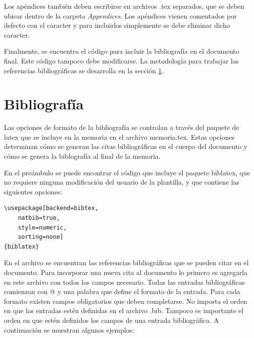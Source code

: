 \begin{verbatim}
	
	 
	
	 
	 
\end{verbatim}

Los apéndices también deben escribirse en archivos .tex separados, que se deben ubicar dentro de la carpeta \emph{Appendices}. Los apéndices vienen comentados por defecto con el caracter \code{\%} y para incluirlos simplemente se debe eliminar dicho caracter.

Finalmente, se encuentra el código para incluir la bibliografía en el documento final.  Este código tampoco debe modificarse. La metodología para trabajar las referencias bibliográficas se desarrolla en la sección \ref{sec:biblio}.

\section{Bibliografía}
\label{sec:biblio}

Las opciones de formato de la bibliografía se controlan a través del paquete de latex  que se incluye en la memoria en el archivo memoria.tex.  Estas opciones determinan cómo se generan las citas bibliográficas en el cuerpo del documento y cómo se genera la biblografía al final de la memoria.

En el preámbulo se puede encontrar el código que incluye el paquete biblatex, que no requiere ninguna modificación del usuario de la plantilla, y que contiene las siguientes opciones:

\begin{lstlisting}
\usepackage[backend=bibtex,
	natbib=true, 
	style=numeric, 
	sorting=none]
{biblatex}
\end{lstlisting}

En el archivo  se encuentran las referencias bibliográficas que se pueden citar en el documento.  Para incorporar una nueva cita al documento lo primero es agregarla en este archivo con todos los campos necesario.  Todas las entradas bibliográficas comienzan con $@$ y una palabra que define el formato de la entrada.  Para cada formato existen campos obligatorios que deben completarse. No importa el orden en que las entradas estén definidas en el archivo .bib.  Tampoco es importante el orden en que estén definidos los campos de una entrada bibliográfica. A continuación se muestran algunos ejemplos:


